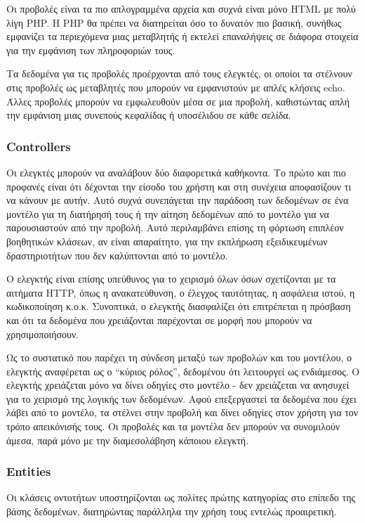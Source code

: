 Οι προβολές είναι τα πιο απλογραμμένα αρχεία και συχνά είναι μόνο HTML με πολύ λίγη PHP. Η PHP θα πρέπει να διατηρείται όσο το δυνατόν πιο βασική, συνήθως εμφανίζει τα περιεχόμενα μιας μεταβλητής ή εκτελεί επαναλήψεις σε διάφορα στοιχεία για την εμφάνιση των πληροφοριών τους.

Τα δεδομένα για τις προβολές προέρχονται από τους ελεγκτές, οι οποίοι τα στέλνουν στις προβολές ως μεταβλητές που μπορούν να εμφανιστούν με απλές κλήσεις echo. Άλλες προβολές μπορούν να εμφωλευθούν μέσα σε μια προβολή, καθιστώντας απλή την εμφάνιση μιας συνεπούς κεφαλίδας ή υποσέλιδου σε κάθε σελίδα.

\subsubsection{Controllers} \label{thb:Controllers}
Οι ελεγκτές μπορούν να αναλάβουν δύο διαφορετικά καθήκοντα. Το πρώτο και πιο προφανές είναι ότι δέχονται την είσοδο του χρήστη και στη συνέχεια αποφασίζουν τι να κάνουν με αυτήν. Αυτό συχνά συνεπάγεται την παράδοση των δεδομένων σε ένα μοντέλο για τη διατήρησή τους ή την αίτηση δεδομένων από το μοντέλο για να παρουσιαστούν από την προβολή. Αυτό περιλαμβάνει επίσης τη φόρτωση επιπλέον βοηθητικών κλάσεων, αν είναι απαραίτητο, για την εκπλήρωση εξειδικευμένων δραστηριοτήτων που δεν καλύπτονται από το μοντέλο.

Ο ελεγκτής είναι επίσης υπεύθυνος για το χειρισμό όλων όσων σχετίζονται με τα αιτήματα HTTP, όπως η ανακατεύθυνση, ο έλεγχος ταυτότητας, η ασφάλεια ιστού, η κωδικοποίηση κ.ο.κ. Συνοπτικά, ο ελεγκτής διασφαλίζει ότι επιτρέπεται η πρόσβαση και ότι τα δεδομένα που χρειάζονται παρέχονται σε μορφή που μπορούν να χρησιμοποιήσουν.

Ως το συστατικό που παρέχει τη σύνδεση μεταξύ των προβολών και του μοντέλου, ο ελεγκτής αναφέρεται ως ο ``κύριος ρόλος'', δεδομένου ότι λειτουργεί ως ενδιάμεσος. Ο ελεγκτής χρειάζεται μόνο να δίνει οδηγίες στο μοντέλο - δεν χρειάζεται να ανησυχεί για το χειρισμό της λογικής των δεδομένων. Αφού επεξεργαστεί τα δεδομένα που έχει λάβει από το μοντέλο, τα στέλνει στην προβολή και δίνει οδηγίες στον χρήστη για τον τρόπο απεικόνισής τους. Οι προβολές και τα μοντέλα δεν μπορούν να συνομιλούν άμεσα, παρά μόνο με την διαμεσολάβηση κάποιου ελεγκτή.

\subsubsection{Entities} \label{thb:Entities}
Οι κλάσεις οντοτήτων υποστηρίζονται ως πολίτες πρώτης κατηγορίας στο επίπεδο της βάσης δεδομένων, διατηρώντας παράλληλα την χρήση τους εντελώς προαιρετική.

